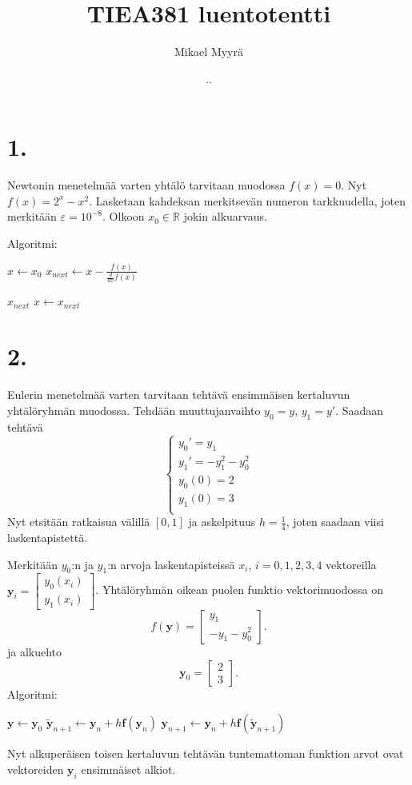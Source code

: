 \documentclass{article}
\title{TIEA381 luentotentti}
\author{Mikael Myyrä}
\date{\number\day.\number\month.\number\year}
\begin{document}
\maketitle

\section*{1.}

Newtonin menetelmää varten yhtälö tarvitaan muodossa $f(x) = 0$.
Nyt $f(x) = 2^x - x^2$.  Lasketaan kahdeksan merkitsevän numeron tarkkuudella,
joten merkitään $\varepsilon = 10^{-8}$.
Olkoon $x_0 \in \mathbb{R}$ jokin alkuarvaus.

Algoritmi:
\begin{algorithmic}
  \State $x\gets x_0$
  \Loop
    \State $x_{next} \gets x - \frac{f(x)}{\frac{d}{dx}f(x)}$
      
      \Return $x_{next}$
    \EndIf
    \State $x \gets x_{next}$
  \EndLoop
\end{algorithmic}


\section*{2.}

Eulerin menetelmää varten tarvitaan tehtävä ensimmäisen kertaluvun yhtälöryhmän muodossa.
Tehdään muuttujanvaihto $y_0 = y$, $y_1 = y'$.
Saadaan tehtävä
\[
  \begin{cases}
    y_0' = y_1 \\
    y_1' = -y_1^2 - y_0^2 \\
    y_0(0) = 2 \\
    y_1(0) = 3 \\
  \end{cases}
\]
Nyt etsitään ratkaisua välillä $[0, 1]$ ja askelpituus $h = \frac{1}{4}$,
joten saadaan viisi laskentapistettä.

Merkitään $y_0$:n ja $y_1$:n arvoja laskentapisteissä $x_i$, $i = 0,1,2,3,4$
vektoreilla $\mathbf{y}_i = \begin{bmatrix}
  y_0(x_i) \\ y_1(x_i)
\end{bmatrix}$.
Yhtälö\-ryhmän oikean puolen funktio vektorimuodossa on
\[
  f(\mathbf{y}) = \begin{bmatrix}
    y_1 \\
    -y_1 - y_0^2
  \end{bmatrix}.
\]
ja alkuehto
\[
  \mathbf{y}_0 = \begin{bmatrix} 2 \\ 3 \end{bmatrix}.
\]
Algoritmi:
\begin{algorithmic}
  \State $\mathbf{y} \gets \mathbf{y}_0$
  \State $\tilde{\mathbf{y}}_{n+1} \gets \mathbf{y}_{n} + h\mathbf{f}(\mathbf{y}_n)$
  \State $\mathbf{y}_{n+1} \gets \mathbf{y}_n + h\mathbf{f}(\tilde{\mathbf{y}}_{n+1})$
  \EndFor
\end{algorithmic}
Nyt alkuperäisen toisen kertaluvun tehtävän tuntemattoman funktion arvot ovat
vektoreiden $\mathbf{y}_i$ ensimmäiset alkiot.
\end{document}
